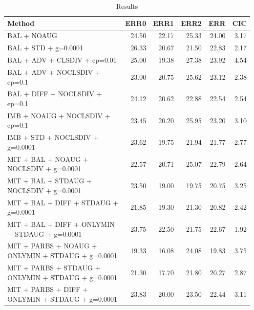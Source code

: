 \begin{table}
\caption{Results}
\label{tab:Results}
\begin{tabular}{lrrrrr}
\toprule
Method & ERR0 & ERR1 & ERR2 & ERR & CIC \\
\midrule
BAL + NOAUG & 24.50 & 22.17 & 25.33 & 24.00 & 3.17 \\
BAL + STD + g=0.0001 & 26.33 & 20.67 & 21.50 & 22.83 & 2.17 \\
BAL + ADV + CLSDIV + ep=0.01 & 25.00 & 19.38 & 27.38 & 23.92 & 4.54 \\
BAL + ADV + NOCLSDIV + ep=0.1 & 23.00 & 20.75 & 25.62 & 23.12 & 2.38 \\
BAL + DIFF + NOCLSDIV + ep=0.1 & 24.12 & 20.62 & 22.88 & 22.54 & 2.54 \\
IMB + NOAUG + NOCLSDIV + ep=0.1 & 23.45 & 20.20 & 25.95 & 23.20 & 3.10 \\
IMB + STD + NOCLSDIV + g=0.0001 & 23.62 & 19.75 & 21.94 & 21.77 & 2.77 \\
MIT + BAL + NOAUG + NOCLSDIV + g=0.0001 & 22.57 & 20.71 & 25.07 & 22.79 & 2.64 \\
MIT + BAL + STDAUG + NOCLSDIV + g=0.0001 & 23.50 & 19.00 & 19.75 & 20.75 & 3.25 \\
MIT + BAL + DIFF + STDAUG + g=0.0001 & 21.85 & 19.30 & 21.30 & 20.82 & 2.42 \\
MIT + BAL + DIFF + ONLYMIN + STDAUG + g=0.0001 & 23.75 & 22.50 & 21.75 & 22.67 & 1.92 \\
MIT + PARBS + NOAUG + ONLYMIN + STDAUG + g=0.0001 & 19.33 & 16.08 & 24.08 & 19.83 & 3.75 \\
MIT + PARBS + STDAUG + ONLYMIN + STDAUG + g=0.0001 & 21.30 & 17.70 & 21.80 & 20.27 & 2.87 \\
MIT + PARBS + DIFF + ONLYMIN + STDAUG + g=0.0001 & 23.83 & 20.00 & 23.50 & 22.44 & 3.11 \\
\bottomrule
\end{tabular}
\end{table}
